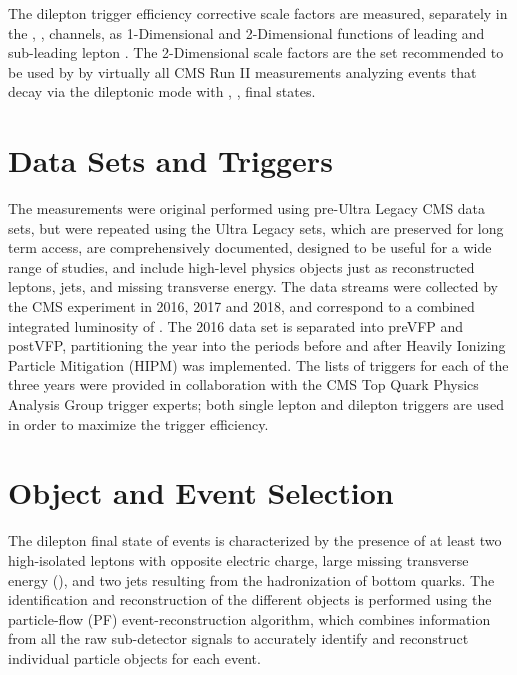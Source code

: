 The dilepton trigger efficiency corrective scale factors are measured, separately in the \ee, \emu, \mumu channels, as 1-Dimensional and 2-Dimensional functions of leading and sub-leading lepton \pT.
The 2-Dimensional scale factors are the set recommended to be used by by virtually all CMS Run II measurements analyzing \ttbar events that decay via the dileptonic mode with \ee, \emu, \mumu final states.

\section{Data Sets and Triggers}
The measurements were original performed using pre-Ultra Legacy CMS data sets, but were repeated using the Ultra Legacy sets, which are preserved for long term access, are comprehensively documented, designed to be useful for a wide range of studies, and include high-level physics objects just as reconstructed leptons, jets, and missing transverse energy.
The data streams were collected by the CMS experiment in 2016, 2017 and 2018, and correspond to a combined integrated luminosity of \lumivalueRuniiUL.
The 2016 data set is separated into preVFP and postVFP, partitioning the year into the periods before and after Heavily Ionizing Particle Mitigation (HIPM) was implemented.
The lists of triggers for each of the three years were provided in collaboration with the CMS Top Quark Physics Analysis Group trigger experts; both single lepton and dilepton triggers are used in order to maximize the trigger efficiency. 

\section{Object and Event Selection}
The dilepton final state of \ttbar events is characterized by the presence of at least two high-\pT isolated leptons with opposite electric charge, large missing transverse energy (\MET), and two jets resulting from the hadronization of bottom quarks.
The identification and reconstruction of the different objects is performed using the particle-flow (PF) event-reconstruction algorithm, which combines information from all the raw sub-detector signals to accurately identify and reconstruct individual particle objects for each event. 
